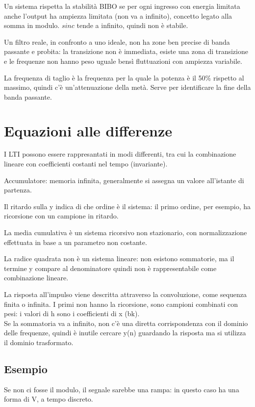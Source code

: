 Un sistema rispetta la stabilità BIBO se per ogni ingresso con energia limitata anche l'output ha ampiezza limitata (non va a infinito), concetto legato alla somma in modulo. $sinc$ tende a infinito, quindi non è stabile. 

Un filtro reale, in confronto a uno ideale, non ha zone ben precise di banda passante e probita: la transizione non è immediata, esiste una zona di transizione e le frequenze non hanno peso uguale bensì fluttuazioni con ampiezza variabile. 

La frequenza di taglio è la frequenza per la quale la potenza è il 50\% rispetto al massimo, quindi c'è un'attenuazione della metà. Serve per identificare la fine della banda passante.

\section{Equazioni alle differenze}
I LTI possono essere rappresantati in modi differenti, tra cui la combinazione lineare con coefficienti costanti nel tempo (invariante). 

Accumulatore: memoria infinita, generalmente si assegna un valore all'istante di partenza. 

Il ritardo sulla y indica di che ordine è il sistema: il primo ordine, per esempio, ha ricorsione con un campione in ritardo. 

La media cumulativa è un sistema ricorsivo non stazionario, con normalizzazione effettuata in base a un parametro non costante. 

La radice quadrata non è un sistema lineare: non esistono sommatorie, ma il termine y compare al denominatore quindi non è rappresentabile come combinazione lineare. 

La risposta all'impulso viene descritta attraverso la convoluzione, come sequenza finita o infinita. I primi non hanno la ricorsione, sono campioni combinati con pesi: i valori di h sono i coefficienti di x (bk). \\
Se la sommatoria va a infinito, non c'è una diretta corrispondenza con il dominio delle frequenze, quindi è inutile cercare y(n) guardando la risposta ma si utilizza il dominio trasformato.




\subsection{Esempio}
Se non ci fosse il modulo, il segnale sarebbe una rampa: in questo caso ha una forma di V, a tempo discreto. 

